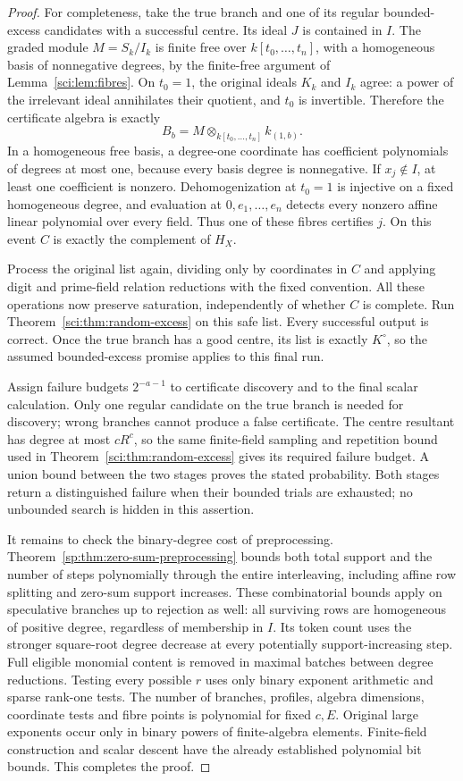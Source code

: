 \begin{proof}
For completeness, take the true branch and one of its regular
bounded-excess candidates with a successful centre. Its ideal $J$ is
contained in $I$. The graded module $M=S_k/I_k$ is finite free over
$k[t_0,\ldots,t_n]$, with a homogeneous basis of nonnegative degrees,
by the finite-free argument of Lemma~\ref{sci:lem:fibres}.
On $t_0=1$, the original ideals $K_k$ and $I_k$ agree: a power of the
irrelevant ideal annihilates their quotient, and $t_0$ is invertible.
Therefore the certificate algebra is exactly
\[
 B_b=M\otimes_{k[t_0,\ldots,t_n]} k_{(1,b)}.
\]
In a homogeneous free basis, a degree-one coordinate has coefficient
polynomials of degrees at most one, because every basis degree is
nonnegative. If $x_j\notin I$, at least one coefficient is nonzero.
Dehomogenization at $t_0=1$ is injective on a fixed homogeneous degree,
and evaluation at $0,e_1,\ldots,e_n$ detects every nonzero affine linear
polynomial over every field. Thus one of these fibres certifies $j$.
On this event $C$ is exactly the complement of $H_X$.

Process the original list again, dividing only by coordinates in $C$
and applying digit and prime-field relation reductions with the fixed
convention. All these
operations now preserve saturation, independently of whether $C$ is
complete. Run Theorem~\ref{sci:thm:random-excess} on this safe list.
Every successful output is correct. Once the true branch has a good
centre, its list is exactly $K^\circ$, so the assumed bounded-excess
promise applies to this final run.

Assign failure budgets $2^{-a-1}$ to certificate discovery and to the
final scalar calculation. Only one regular candidate on the true branch
is needed for discovery; wrong branches cannot produce a false
certificate. The centre resultant has degree at most $cR^c$, so the
same finite-field sampling and repetition bound used in
Theorem~\ref{sci:thm:random-excess} gives its required failure budget.
A union bound between the two stages proves the stated probability.
Both stages return a distinguished failure when their bounded trials
are exhausted; no unbounded search is hidden in this assertion.

It remains to check the binary-degree cost of preprocessing.
Theorem~\ref{sp:thm:zero-sum-preprocessing} bounds both total support
and the number of steps polynomially through the entire interleaving,
including affine row splitting and zero-sum support increases.
These combinatorial bounds apply on speculative branches up to rejection
as well: all surviving rows are homogeneous of positive degree,
regardless of membership in $I$.
Its token count uses the stronger square-root degree decrease at
every potentially support-increasing step. Full eligible monomial
content is removed in maximal batches between degree reductions.
Testing every possible $r$ uses only
binary exponent arithmetic and sparse rank-one tests. The number of
branches, profiles, algebra dimensions, coordinate tests and fibre
points is polynomial for fixed $c,E$. Original large exponents occur
only in binary powers of finite-algebra elements. Finite-field
construction and scalar descent have the already established polynomial
bit bounds. This completes the proof.
\end{proof}

